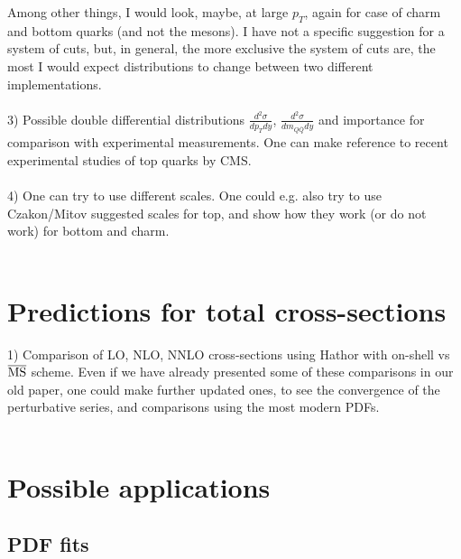\documentclass[12pt,a4paper]{article}
\begin{document}
Among other things, I would look, maybe, at large $p_T$, again for case of charm and bottom quarks (and not the mesons). 
I have not a specific suggestion for a system of cuts, but, in general, the more exclusive the system of cuts are, the most I would expect distributions to change between two different implementations. 
\\
\\
3) Possible double differential distributions $\frac{d^2\sigma}{dp_T dy}$, $\frac{d^2\sigma}{dm_{Q\bar{Q}} dy}$ and importance for comparison with experimental measurements. One can make reference to recent experimental studies of top quarks by CMS. 
\\
\\
4) One can try to use different scales. One could e.g. also try to use Czakon/Mitov suggested scales for top, and show how they work (or do not work) for bottom and charm. 
\\
\\

\section{Predictions for total cross-sections}
\label{total}

1) Comparison of LO, NLO, NNLO cross-sections using Hathor with on-shell vs $\overline{\rm MS}$ scheme. Even if we have already presented some of these comparisons in our old paper, one could make further updated ones, to see the convergence of the perturbative series, and comparisons using the most modern PDFs. 
\\
\\

\section{Possible applications}
\label{appli}

\subsection{PDF fits}
\end{document}
